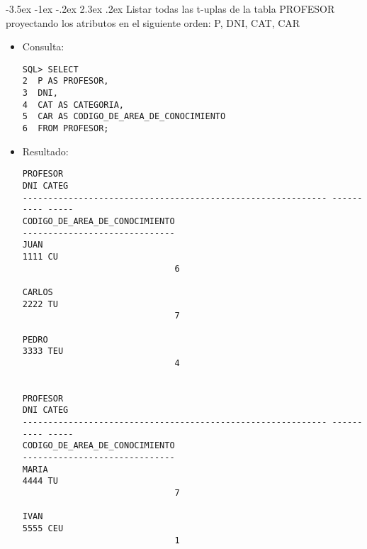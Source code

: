 \documentclass[11pt]{report}
\makeatletter
\renewcommand\chapter{\@startsection{chapter}{0}{\z@}%
    {-3.5ex \@plus -1ex \@minus -.2ex}%
    {2.3ex \@plus.2ex}%
    {\normalfont\Large\bfseries}}
\makeatother
\begin{document}
\chapter{Listar todas las t-uplas de la tabla PROFESOR proyectando los atributos en el siguiente orden: P, DNI, CAT, CAR}
\begin{itemize}
  \item Consulta:
  \begin{verbatim}
SQL> SELECT
2  P AS PROFESOR,
3  DNI,
4  CAT AS CATEGORIA,
5  CAR AS CODIGO_DE_AREA_DE_CONOCIMIENTO
6  FROM PROFESOR;
  \end{verbatim}
  \item{Resultado:}
  \begin{verbatim}
PROFESOR                                                            DNI CATEG   
------------------------------------------------------------ ---------- -----   
CODIGO_DE_AREA_DE_CONOCIMIENTO                                                  
------------------------------                                                  
JUAN                                                               1111 CU      
                              6                                                  
                                                                                
CARLOS                                                             2222 TU      
                              7                                                  
                                                                                
PEDRO                                                              3333 TEU     
                              4                                                  
                                                                                

PROFESOR                                                            DNI CATEG   
------------------------------------------------------------ ---------- -----   
CODIGO_DE_AREA_DE_CONOCIMIENTO                                                  
------------------------------                                                  
MARIA                                                              4444 TU      
                              7                                                  
                                                                                
IVAN                                                               5555 CEU     
                              1                                                  
                                                                                

\end{verbatim}
\end{itemize}
\end{document}
